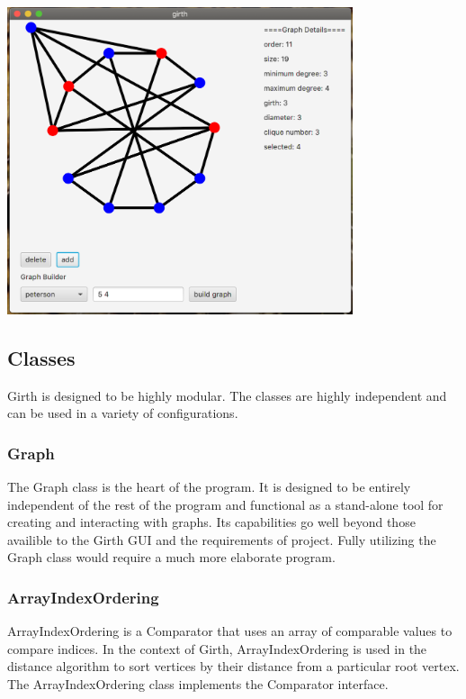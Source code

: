 \documentclass{article}
\begin{document}
\begin{center}\includegraphics[width=4in, keepaspectratio]{pictures/add-vertex.png}\end{center}

\subsection{Classes}

Girth is designed to be highly modular. The classes are highly independent and can be used in a variety of configurations.

\subsubsection{Graph}

The Graph class is the heart of the program.
It is designed to be entirely independent of the rest of the program
and functional as a stand-alone tool for creating and interacting with graphs.
Its capabilities go well beyond those availible to the Girth GUI and the requirements of project.
Fully utilizing the Graph class would require a much more elaborate program.

\subsubsection{ArrayIndexOrdering}

ArrayIndexOrdering is a Comparator that uses an array of comparable values to compare indices.
In the context of Girth,
ArrayIndexOrdering is used in the distance algorithm to sort vertices by their distance from a particular root vertex.
The ArrayIndexOrdering class implements the Comparator interface.
\end{document}
